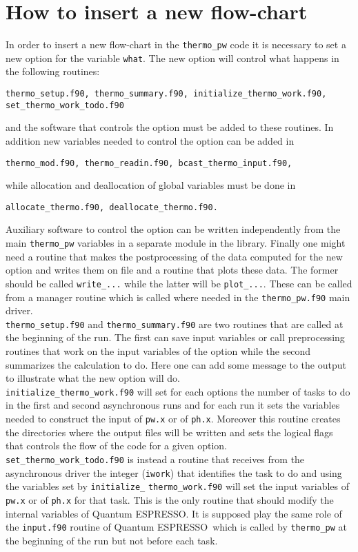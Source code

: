 \documentclass[12pt,a4paper]{article}
\def\qe{{\sc Quantum ESPRESSO}}
\begin{document}
\newpage
\section{\color{coral}How to insert a new flow-chart}
In order to insert a new flow-chart in the \texttt{thermo\_pw} code it
is necessary to set a new option for the variable \texttt{what}. The
new option will control what happens in the following routines:
\begin{verbatim}
thermo_setup.f90, thermo_summary.f90, initialize_thermo_work.f90, set_thermo_work_todo.f90
\end{verbatim}
and the software that controls the option must be added to these routines.
In addition new variables needed to control the option can be added
in 
\begin{verbatim}
thermo_mod.f90, thermo_readin.f90, bcast_thermo_input.f90,
\end{verbatim}
while allocation and deallocation of global variables must be done
in 
\begin{verbatim}
allocate_thermo.f90, deallocate_thermo.f90.
\end{verbatim}
Auxiliary software to control the option can be written independently
from the main \texttt{thermo\_pw} variables in a separate
module in the library. Finally one might need a routine that makes the
postprocessing of the data computed for the new option and writes them on
file and a routine that plots these data. The former should be called 
\texttt{write\_...} while the latter will be \texttt{plot\_...}.
These can be called from a manager routine which is called where needed
in the \texttt{thermo\_pw.f90} main driver. \\
\texttt{thermo\_setup.f90} and \texttt{thermo\_summary.f90} are two routines 
that are called at the beginning of the run. The first
can save input variables or call preprocessing routines that work on 
the input variables of the option while the second summarizes the 
calculation to do. Here one can add some message to the output to 
illustrate what the new option will do. \\ 
\texttt{initialize\_thermo\_work.f90} will set for each options the
number of tasks to do in the first and second asynchronous runs and
for each run it sets the variables needed to construct the
input of \texttt{pw.x} or of \texttt{ph.x}. Moreover this routine creates
the directories where the output files will be written and sets the
logical flags that controls the flow of the code for a given option. \\
\texttt{set\_thermo\_work\_todo.f90} is instead a routine that receives
from the asynchronous driver the integer (\texttt{iwork}) that identifies
the task to do and using the variables set by
\texttt{initialize\_} \texttt{thermo\_work.f90} will set the input variables
of \texttt{pw.x} or of \texttt{ph.x} for that task. This is the only 
routine that should modify the internal variables of \qe. It is supposed
play the same role of the \texttt{input.f90} routine of \qe\  
which is called by \texttt{thermo\_pw} at the beginning of the run
but not before each task.
\end{document}
